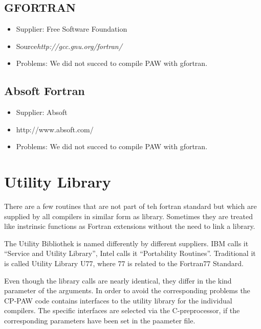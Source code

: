 \documentclass[a4paper,10pt]{report}
\begin{document}
\subsection{GFORTRAN}
\begin{itemize}
\item Supplier: Free Software Foundation
\item Source\textit{http://gcc.gnu.org/fortran/}
\item Problems: We did not succed to compile PAW with gfortran.
\end{itemize}


\subsection{Absoft Fortran}
\begin{itemize}
\item Supplier: Absoft
\item http://www.absoft.com/
\item Problems: We did not succed to compile PAW with gfortran.
\end{itemize}


\section{Utility Library}
\label{sec:utility}
There are a few routines that are not part of teh fortran standard but
which are supplied by all compilers in similar form as
library. Sometimes they are treated like instrinsic functions as
Fortran extensions without the need to link a library.

The Utility Bibliothek is named differently by different
suppliers. IBM calls it ``Service and Utility Library'', Intel calls
it ``Portability Routines''. Traditional it is called Utility Library
U77, where 77 is related to the Fortran77 Standard.

Even though the library calls are nearly identical, they differ in the
kind parameter of the arguments. In order to avoid the corresponding
problems the CP-PAW code contains interfaces to the utility library
for the individual compilers. The specific interfaces are selected via
the C-preprocessor, if the corresponding parameters have been set in
the paameter file.
\end{document}
